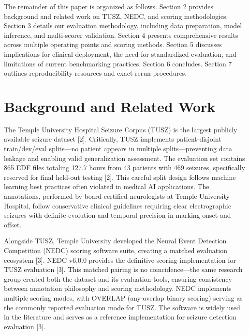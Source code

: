 \documentclass[
]{article}
\begin{document}
The remainder of this paper is organized as follows. Section 2 provides
background and related work on TUSZ, NEDC, and scoring methodologies.
Section 3 details our evaluation methodology, including data
preparation, model inference, and multi-scorer validation. Section 4
presents comprehensive results across multiple operating points and
scoring methods. Section 5 discusses implications for clinical
deployment, the need for standardized evaluation, and limitations of
current benchmarking practices. Section 6 concludes. Section 7 outlines
reproducibility resources and exact rerun procedures.

\hypertarget{background-and-related-work}{%
\section{Background and Related
Work}\label{background-and-related-work}}

The Temple University Hospital Seizure Corpus (TUSZ) is the largest
publicly available seizure dataset {[}2{]}. Critically, TUSZ implements
patient-disjoint train/dev/eval splits---no patient appears in multiple
splits---preventing data leakage and enabling valid generalization
assessment. The evaluation set contains 865 EDF files totaling 127.7
hours from 43 patients with 469 seizures, specifically reserved for
final held-out testing {[}2{]}. This careful split design follows
machine learning best practices often violated in medical AI
applications. The annotations, performed by board-certified neurologists
at Temple University Hospital, follow conservative clinical guidelines
requiring clear electrographic seizures with definite evolution and
temporal precision in marking onset and offset.

Alongside TUSZ, Temple University developed the Neural Event Detection
Competition (NEDC) scoring software suite, creating a matched evaluation
ecosystem {[}3{]}. NEDC v6.0.0 provides the definitive scoring
implementation for TUSZ evaluation {[}3{]}. This matched pairing is no
coincidence---the same research group created both the dataset and its
evaluation tools, ensuring consistency between annotation philosophy and
scoring methodology. NEDC implements multiple scoring modes, with
OVERLAP (any-overlap binary scoring) serving as the commonly reported
evaluation mode for TUSZ. The software is widely used in the literature
and serves as a reference implementation for seizure detection
evaluation {[}3{]}.
\end{document}
